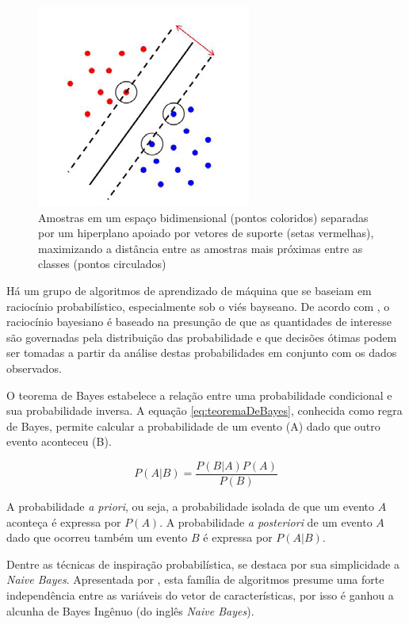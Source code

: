 \begin{figure}[h!]
  \centering
  \includegraphics[scale=0.5]{imgs/svm}
  \caption[Máquina de vetores de suporte]{Amostras em um espaço bidimensional (pontos coloridos) separadas por um hiperplano apoiado por vetores de suporte (setas vermelhas), maximizando a distância entre as amostras mais próximas entre as classes (pontos circulados)}
  \label{fig:svm}
\end{figure}

Há um grupo de algoritmos de aprendizado de máquina que se baseiam em raciocínio probabilístico, especialmente sob o viés bayseano. De acordo com , o raciocínio bayesiano é baseado na presunção de que as quantidades de interesse são governadas pela distribuição das probabilidade e que decisões ótimas podem ser tomadas a partir da análise destas probabilidades em conjunto com os dados observados.

O teorema de Bayes estabelece a relação entre uma probabilidade condicional e sua probabilidade inversa. A equação \ref{eq:teoremaDeBayes}, conhecida como regra de Bayes, permite calcular a probabilidade de um evento (A) dado que outro evento aconteceu (B).

\begin{equation}
	\displaystyle P(A|B) = \frac{P(B|A) P(A)}{P(B)}
\label{eq:teoremaDeBayes}
\end{equation}

A probabilidade \textit{a priori}, ou seja, a probabilidade isolada de que um evento $A$ aconteça é expressa por $P(A)$. A probabilidade \textit{a posteriori} de um evento $A$ dado que ocorreu também um evento $B$ é expressa por $P(A|B)$.

Dentre as técnicas de inspiração probabilística, se destaca por sua simplicidade a \textit{Naive Bayes}. Apresentada por , esta família de algoritmos presume uma forte independência entre as variáveis do vetor de características, por isso é ganhou a alcunha de Bayes Ingênuo (do inglês \textit{Naive Bayes}).

